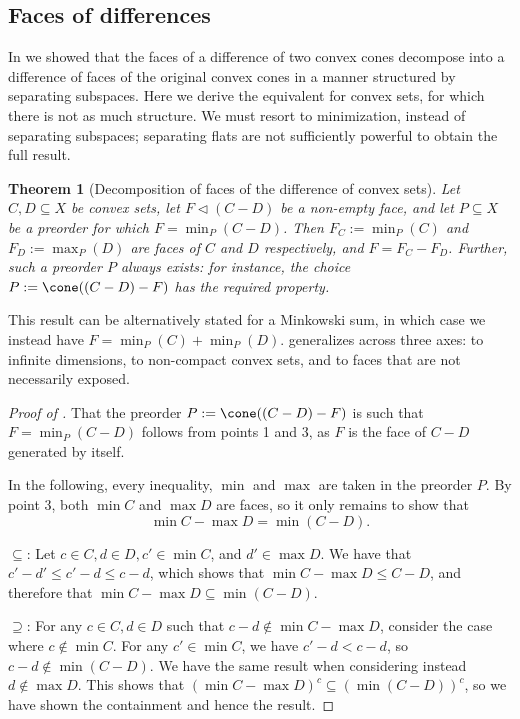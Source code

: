\documentclass{article}
\theoremstyle{plain}
\newtheorem{theorem}{Theorem}[section]
\theoremstyle{definition}
\theoremstyle{remark}
\begin{document}
\subsection{Faces of differences}
\label{loc:body.applications.faces_of_differences}
In  we showed that the faces of a difference of two convex cones decompose into a difference of faces of the original convex cones in a manner structured by separating subspaces. Here we derive the equivalent for convex sets, for which there is not as much structure.
We must resort to minimization, instead of separating subspaces; separating
flats are not sufficiently powerful to obtain the full result.
\begin{theorem}[Decomposition of faces of the difference of convex sets]
\label{loc:decomposition_of_faces_of_the_difference_of_convex_sets.statement}
Let $C, D \subseteq X$ be convex sets, let $F \triangleleft (C-D)$ be a non-empty face, and let
$P \subseteq X$ be a preorder for which $F = \min_{P} (C-D)$.
Then $F_C := \min_{P}(C)$ and $F_D := \max_{P}(D)$ are faces of $C$ and $D$ respectively, and $F = F_C-F_D$.
Further, such a preorder $P$ always exists: for instance, the choice $P := \cone((C-D)-F)$ has the required property. 
\end{theorem}
This result can be alternatively stated for a Minkowski sum,
in which case we instead have $F = \min_{P}(C) + \min_{P}(D)$.
 generalizes \cite[Theorem 1.7.5]{schneider_ConvexBodiesBrunn_2013}
across three axes: to infinite dimensions, to non-compact convex sets,
and to faces that are not necessarily exposed.
\begin{proof}[\hypertarget{loc:decomposition_of_faces_of_the_difference_of_convex_sets.proof}{}Proof of ]

That the preorder $P := \cone((C-D)-F)$ is such that $F = \min_{P} (C-D)$
follows from  points 1 and 3, as $F$ is the face of $C-D$ generated by itself.

In
the following, every inequality, $\min$ and $\max$ are taken in the preorder $P$. By 
 point 3,
both $\min C$ and $\max D$ are faces, so it only remains to show that
\begin{equation*}
\min C - \max D = \min (C-D).
\end{equation*}

$\subseteq$: Let $c \in C, d \in D, c' \in \min C$, and
$d' \in \max D$. We have that $c'-d' \leq c'-d \leq c-d$,
which shows that $\min C - \max D \leq C - D$, and therefore that
$\min C - \max D \subseteq \min (C-D)$.

$\supseteq$: For any $c \in C, d \in D$ such that $c-d \notin \min C-\max D$,
consider the case where $c \notin \min C$. For any $c' \in  \min C$,
we have $c'- d < c-d$, so $c-d \notin \min(C-D)$. We have the same result when considering instead 
$d \notin \max D$. This shows that
$(\min C - \max D)^c \subseteq (\min (C-D))^c$, so we have shown the containment and hence the result.
\end{proof}
\end{document}
